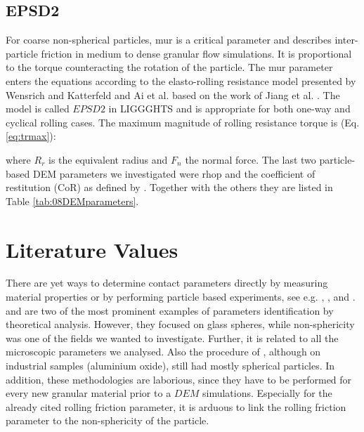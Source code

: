 % 
% 
% 
% 
% 

\subsection{EPSD2}
\label{subsec:epsd2}

For coarse non-spherical particles, \acs{mur} is a critical parameter and describes
inter-particle friction in medium to dense granular flow simulations. It is proportional to the 
torque counteracting the rotation of the particle. The \acs{mur} parameter enters the 
equations according to the elasto-rolling resistance model presented by Wensrich and 
Katterfeld \cite{RefWorks:87} and Ai et al. \cite{RefWorks:131} 
based on the work of Jiang et al. \cite{RefWorks:143}. 
The model is called $EPSD2$ in \acs{LIGGGHTS} and is appropriate for both one-way and cyclical rolling cases.
The maximum magnitude of rolling resistance torque is (Eq. \ref{eq:trmax}):



where $R_r$ is the equivalent radius and $F_n$ the normal force.
The last two particle-based \acs{DEM} parameters we investigated were \acs{rhop}
and the coefficient of restitution (\acs{CoR}) as defined by
\citet{RefWorks:131}.
Together with the others they are listed in Table \ref{tab:08DEMparameters}.\\



\section{Literature Values}
\label{sec:literaturevalues}

There are yet ways to determine contact parameters directly by measuring
material properties or by performing particle based experiments, see e.g.
\citet{RefWorks:177}, \citet{RefWorks:181}, and \citet{RefWorks:186}.
\citet{RefWorks:140} and \citet{RefWorks:190}
are two of the most prominent examples of parameters identification by
theoretical analysis. However, they focused on glass spheres, while
non-sphericity was one of the fields we wanted to investigate. 
Further, it is related to all the microscopic parameters we analysed. 
Also the procedure of \citet{RefWorks:177}, although on
industrial samples (aluminium oxide), still had mostly spherical particles. 
In addition, these methodologies are laborious, 
since they have to be performed for every new granular material prior to a $DEM$
simulations. 
Especially for the already cited rolling friction parameter, it is arduous to
link the rolling friction parameter to the non-sphericity of the particle. 